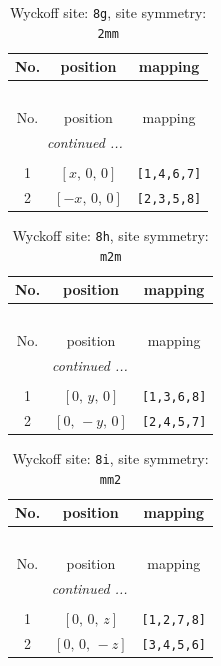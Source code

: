 \documentclass[fleqn,8pt]{jsarticle}
\begin{document}
\begin{longtable}{ccc}
\caption{Wyckoff site: {\tt 8g}, site symmetry: {\tt 2mm}}
 \\
 \hline \hline
No. & position & mapping \\ \hline \endfirsthead

\multicolumn{2}{l}{\tablename\ \thetable{}} \\
 \hline \hline
No. & position & mapping \\ \hline \endhead

 \hline \hline
\multicolumn{2}{r}{\footnotesize\it continued ...} \\ \endfoot

 \hline \hline
\multicolumn{2}{r}{} \\ \endlastfoot

1 & $\left[ x,\, 0,\, 0 \right]$ & {\tt [1,4,6,7]} \\ \hline
2 & $\left[ - x,\, 0,\, 0 \right]$ & {\tt [2,3,5,8]} \\
\end{longtable}
\renewcommand{\arraystretch}{1.2}
\begin{longtable}{ccc}
\caption{Wyckoff site: {\tt 8h}, site symmetry: {\tt m2m}}
 \\
 \hline \hline
No. & position & mapping \\ \hline \endfirsthead

\multicolumn{2}{l}{\tablename\ \thetable{}} \\
 \hline \hline
No. & position & mapping \\ \hline \endhead

 \hline \hline
\multicolumn{2}{r}{\footnotesize\it continued ...} \\ \endfoot

 \hline \hline
\multicolumn{2}{r}{} \\ \endlastfoot

1 & $\left[ 0,\, y,\, 0 \right]$ & {\tt [1,3,6,8]} \\ \hline
2 & $\left[ 0,\, - y,\, 0 \right]$ & {\tt [2,4,5,7]} \\
\end{longtable}
\renewcommand{\arraystretch}{1.2}
\begin{longtable}{ccc}
\caption{Wyckoff site: {\tt 8i}, site symmetry: {\tt mm2}}
 \\
 \hline \hline
No. & position & mapping \\ \hline \endfirsthead

\multicolumn{2}{l}{\tablename\ \thetable{}} \\
 \hline \hline
No. & position & mapping \\ \hline \endhead

 \hline \hline
\multicolumn{2}{r}{\footnotesize\it continued ...} \\ \endfoot

 \hline \hline
\multicolumn{2}{r}{} \\ \endlastfoot

1 & $\left[ 0,\, 0,\, z \right]$ & {\tt [1,2,7,8]} \\ \hline
2 & $\left[ 0,\, 0,\, - z \right]$ & {\tt [3,4,5,6]} \\
\end{longtable}
\end{document}
